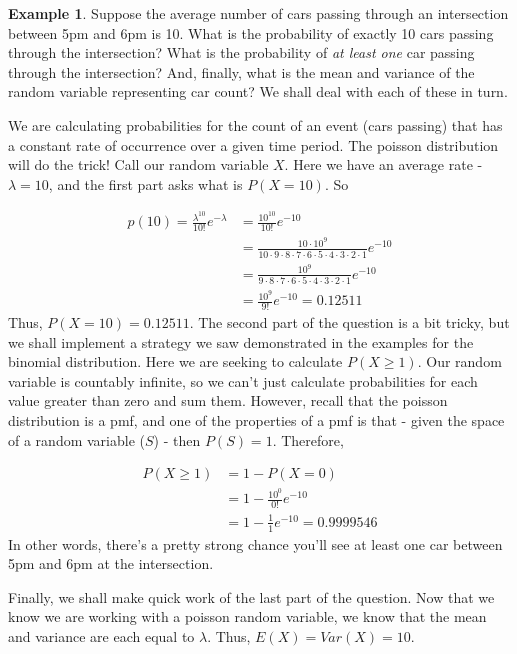 \documentclass[
]{book}
\theoremstyle{definition}
\theoremstyle{definition}
\newtheorem{example}{Example}[chapter]
\theoremstyle{definition}
\theoremstyle{definition}
\theoremstyle{remark}
\begin{document}
\begin{example}
\protect\hypertarget{exm:poissoninf}{}\label{exm:poissoninf}Suppose the average number of cars passing through an intersection between 5pm and 6pm is 10. What is the probability of exactly 10 cars passing through the intersection? What is the probability of \emph{at least one} car passing through the intersection? And, finally, what is the mean and variance of the random variable representing car count? We shall deal with each of these in turn.

We are calculating probabilities for the count of an event (cars passing) that has a constant rate of occurrence over a given time period. The poisson distribution will do the trick! Call our random variable \(X\). Here we have an average rate - \(\lambda = 10\), and the first part asks what is \(P(X = 10)\). So

\begin{align}
p(10) = \frac{\lambda^{10}}{10!} e^{-\lambda} &= \frac{10^{10}}{10!} e^{-10} \\
&= \frac{10\cdot10^{9}}{10\cdot9\cdot8\cdot7\cdot6\cdot5\cdot4\cdot3\cdot2\cdot1} e^{-10} \\
&= \frac{10^{9}}{9\cdot8\cdot7\cdot6\cdot5\cdot4\cdot3\cdot2\cdot1} e^{-10} \\
&= \frac{10^{9}}{9!} e^{-10} = 0.12511
\end{align}
Thus, \(P(X = 10) = 0.12511\). The second part of the question is a bit tricky, but we shall implement a strategy we saw demonstrated in the examples for the binomial distribution. Here we are seeking to calculate \(P(X\geq1)\). Our random variable is countably infinite, so we can't just calculate probabilities for each value greater than zero and sum them. However, recall that the poisson distribution is a pmf, and one of the properties of a pmf is that - given the space of a random variable (\(S\)) - then \(P(S) = 1\). Therefore,

\begin{align}
P(X\geq1) &= 1 - P(X = 0) \\
&= 1 - \frac{10^{0}}{0!} e^{-10} \\
&= 1 - \frac{1}{1} e^{-10} = 0.9999546
\end{align}
In other words, there's a pretty strong chance you'll see at least one car between 5pm and 6pm at the intersection.

Finally, we shall make quick work of the last part of the question. Now that we know we are working with a poisson random variable, we know that the mean and variance are each equal to \(\lambda\). Thus, \(E(X) = Var(X) = 10\).
\end{example}
\end{document}
